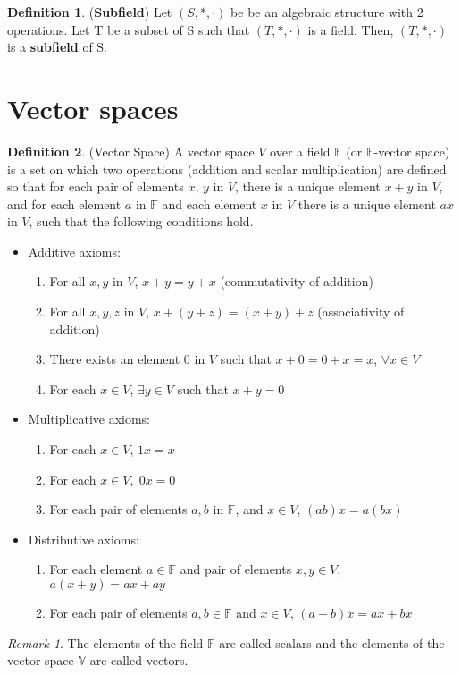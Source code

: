 \documentclass[12pt]{article}
\theoremstyle{definition}
\newtheorem{definition}{Definition}[section]
\theoremstyle{remark}
\newtheorem*{remark}{Remark}
\begin{document}
    \begin{definition}(\textbf{Subfield})
        Let $(S,*,\cdot)$ be be an algebraic structure with 2 operations.
        Let T be a subset of S such that $(T,*,\cdot)$ is a field. Then, $(T,*,\cdot)$ is a \textbf{subfield} of S.
    \end{definition}
\section{Vector spaces}
    \begin{definition}(Vector Space)
        A vector space $V$ over a field $\mathbb{F}$ (or $\mathbb{F}$-vector space) is a set on which 
        two operations (addition and scalar multiplication) are defined so that for each pair of elements 
        $x$, $y$  in $V$, there is a unique element $x+y$ in $V$, and for each element $a$ in $\mathbb{F}$ and each element 
        $x$ in $V$ there is a unique element $ax$ in $V$, such that the following conditions hold.
        \begin{itemize}
            \item Additive axioms:
            \begin{enumerate}
                \item For all $x,y$ in $V$, $x+y=y+x$ (commutativity of addition)
                \item For all $x,y,z$ in $V$, $x+(y+z)=(x+y)+z$ (associativity of addition)
                \item There exists an element $0$ in $V$ such that $x+0=0+x=x$, $\forall x\in V$
                \item For each $x\in V$, $\exists y\in V$ such that $x+y = 0$ 
            \end{enumerate}
            \item Multiplicative axioms:
            \begin{enumerate}
                \item For each $x \in V$, $1x = x$
                \item For each $x \in V,\; 0x=0$
                \item For each pair of elements $a,b$ in $\mathbb{F}$, and $x\in V$, $(ab)x=a(bx)$
            \end{enumerate}
            \item Distributive axioms:
            \begin{enumerate}
                \item For each element $a \in \mathbb{F}$ and pair of elements $x,y \in V$, $a(x+y)=ax+ay$
                \item For each pair of elements $a,b \in \mathbb{F}$ and $x \in V$, $(a+b)x = ax+bx$ 
            \end{enumerate}
        \end{itemize}

    \begin{remark}
        The elements of the field $\mathbb{F}$ are called scalars and the elements of the vector 
        space $\mathbb{V}$ are called vectors.
    \end{remark}
    \end{definition}
\end{document}
